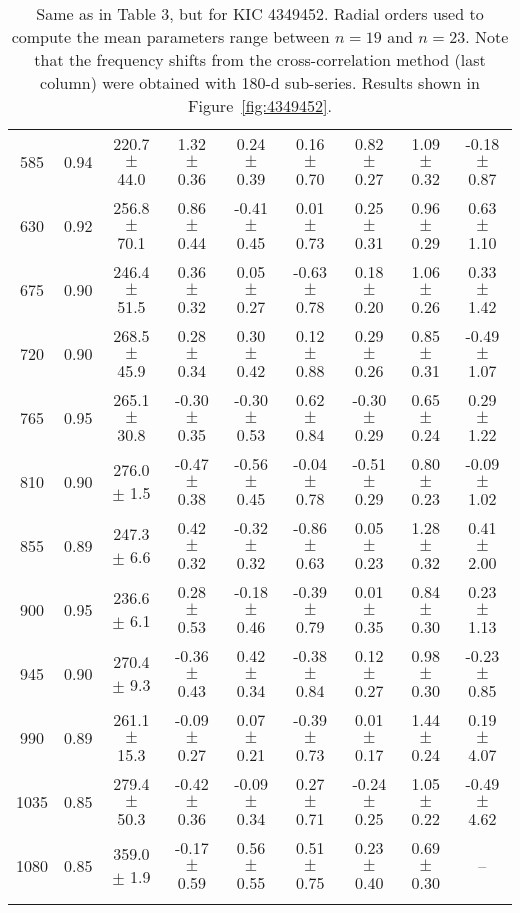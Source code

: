 \documentclass[twocolumn]{aastex61}%
\begin{document}
\begin{table*}[ht]
\begin{tabular}{ccc|ccccc|c}
585 & 0.94 & 220.7 $\pm$ 44.0 & 1.32 $\pm$ 0.36 & 0.24 $\pm$ 0.39 & 0.16 $\pm$ 0.70 & 0.82 $\pm$ 0.27 & 1.09 $\pm$ 0.32 & -0.18 $\pm$ 0.87\\
630 & 0.92 & 256.8 $\pm$ 70.1 & 0.86 $\pm$ 0.44 & -0.41 $\pm$ 0.45 & 0.01 $\pm$ 0.73 & 0.25 $\pm$ 0.31 & 0.96 $\pm$ 0.29 & 0.63 $\pm$ 1.10\\
675 & 0.90 & 246.4 $\pm$ 51.5 & 0.36 $\pm$ 0.32 & 0.05 $\pm$ 0.27 & -0.63 $\pm$ 0.78 & 0.18 $\pm$ 0.20 & 1.06 $\pm$ 0.26 & 0.33 $\pm$ 1.42\\
720 & 0.90 & 268.5 $\pm$ 45.9 & 0.28 $\pm$ 0.34 & 0.30 $\pm$ 0.42 & 0.12 $\pm$ 0.88 & 0.29 $\pm$ 0.26 & 0.85 $\pm$ 0.31 & -0.49 $\pm$ 1.07\\
765 & 0.95 & 265.1 $\pm$ 30.8 & -0.30 $\pm$ 0.35 & -0.30 $\pm$ 0.53 & 0.62 $\pm$ 0.84 & -0.30 $\pm$ 0.29 & 0.65 $\pm$ 0.24 & 0.29 $\pm$ 1.22\\
810 & 0.90 & 276.0 $\pm$ 1.5 & -0.47 $\pm$ 0.38 & -0.56 $\pm$ 0.45 & -0.04 $\pm$ 0.78 & -0.51 $\pm$ 0.29 & 0.80 $\pm$ 0.23 & -0.09 $\pm$ 1.02\\
855 & 0.89 & 247.3 $\pm$ 6.6 & 0.42 $\pm$ 0.32 & -0.32 $\pm$ 0.32 & -0.86 $\pm$ 0.63 & 0.05 $\pm$ 0.23 & 1.28 $\pm$ 0.32 & 0.41 $\pm$ 2.00\\
900 & 0.95 & 236.6 $\pm$ 6.1 & 0.28 $\pm$ 0.53 & -0.18 $\pm$ 0.46 & -0.39 $\pm$ 0.79 & 0.01 $\pm$ 0.35 & 0.84 $\pm$ 0.30 & 0.23 $\pm$ 1.13\\
945 & 0.90 & 270.4 $\pm$ 9.3 & -0.36 $\pm$ 0.43 & 0.42 $\pm$ 0.34 & -0.38 $\pm$ 0.84 & 0.12 $\pm$ 0.27 & 0.98 $\pm$ 0.30 & -0.23 $\pm$ 0.85\\
990 & 0.89 & 261.1 $\pm$ 15.3 & -0.09 $\pm$ 0.27 & 0.07 $\pm$ 0.21 & -0.39 $\pm$ 0.73 & 0.01 $\pm$ 0.17 & 1.44 $\pm$ 0.24 & 0.19 $\pm$ 4.07\\
1035 & 0.85 & 279.4 $\pm$ 50.3 & -0.42 $\pm$ 0.36 & -0.09 $\pm$ 0.34 & 0.27 $\pm$ 0.71 & -0.24 $\pm$ 0.25 & 1.05 $\pm$ 0.22 & -0.49 $\pm$ 4.62\\
1080 & 0.85 & 359.0 $\pm$ 1.9 & -0.17 $\pm$ 0.59 & 0.56 $\pm$ 0.55 & 0.51 $\pm$ 0.75 & 0.23 $\pm$ 0.40 & 0.69 $\pm$ 0.30 & --\\\vspace{-0.35cm}
\end{tabular}
\caption{Same as in Table 3, but for KIC 4349452. {Radial orders used to compute the mean parameters range between $n=19$ and $n=23$.} Note that the frequency shifts from the cross-correlation method (last column) were obtained with 180-d sub-series. Results shown in Figure~\ref{fig:4349452}.}\label{tab:4349452}\vspace{-0.2cm}
\end{table*}
\end{document}
